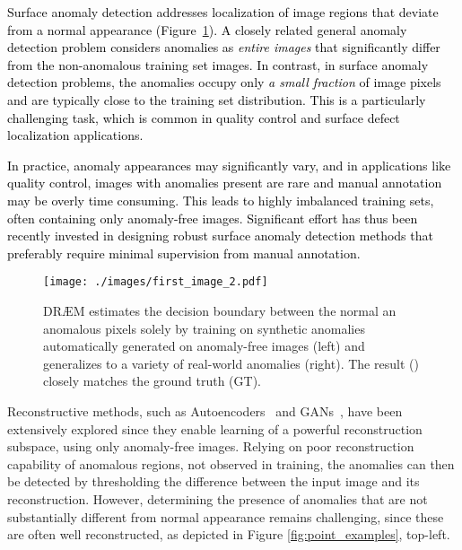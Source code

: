 \documentclass[10pt,twocolumn,letterpaper]{article}
\newcommand\ntext[1]{\textcolor{black}{#1}}
\begin{document}
\ntext{Surface anomaly detection addresses localization of image regions that deviate from a normal appearance (Figure~\ref{fig:anomaly_detection_example}). 
A closely related general anomaly detection problem considers anomalies as \textit{entire images} that significantly differ from the non-anomalous training set images. In contrast, in surface anomaly detection problems, the anomalies occupy only \textit{a small fraction} of image pixels and are typically close to the training set distribution. This is a particularly challenging task, which is common in quality control and surface defect localization applications.}

\ntext{In practice, anomaly appearances may significantly vary, and in applications like quality control, images with anomalies present are rare and manual annotation may be overly time consuming. This leads to highly imbalanced training sets, often containing only anomaly-free images. Significant effort has thus been recently invested in designing robust surface anomaly detection methods that preferably require minimal supervision from manual annotation.} 






\begin{figure}
\centering
  \texttt{[image: ./images/first\_image\_2.pdf]}
\caption{DR{\AE}M estimates the decision boundary between the normal an anomalous pixels solely by training on synthetic anomalies automatically generated on anomaly-free images (left) and generalizes to a variety of real-world anomalies (right). The result () closely matches the ground truth (GT).
}
\label{fig:anomaly_detection_example}
\end{figure}

Reconstructive methods, such as Autoencoders~\cite{bergmann2018improving,akcay2018ganomaly,akccay2019skip, tang2020anomaly} and GANs~\cite{schlegl2017unsupervised,schlegl2019f}, have been extensively explored since they enable learning of a powerful reconstruction subspace, using only anomaly-free images.
Relying on poor reconstruction capability of anomalous regions, not observed in training, the anomalies can then be detected by thresholding the difference between the input image and its reconstruction. 
However, determining the presence of anomalies that are not substantially different from normal appearance remains challenging, since these are often well reconstructed, as depicted in Figure \ref{fig:point_examples}, top-left.
\end{document}
